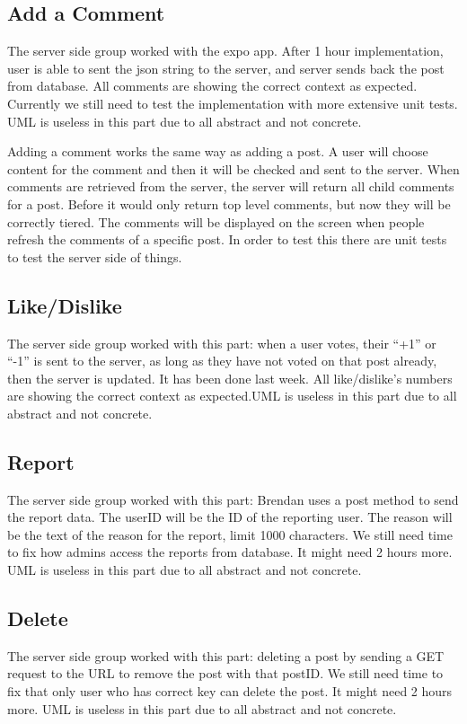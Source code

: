 \documentclass[12pt]{article}
\begin{document}
\subsection{Add a Comment}
The server side group worked with the expo app. After 1 hour implementation,
user is able to sent the json string to the server, and server sends back the
post from database. All comments are showing the correct context as expected.
Currently we still need to test the implementation with more extensive unit
tests. UML is useless in this part due to all abstract and not concrete.

Adding a comment works the same way as adding a post.  A user will choose content
for the comment and then it will be checked and sent to the server.  When comments
are retrieved from the server, the server will return all child comments for a post.
Before it would only return top level comments, but now they will be correctly
tiered.  The comments will be displayed on the screen when people refresh the
comments of a specific post.  In order to test this there are unit tests to test
the server side of things.

\subsection{Like/Dislike}
The server side group worked with this part: when a user votes, their “+1” or
“-1” is sent to the server, as long as they have not voted on that post already,
then the server is updated. It has been done last week. All like/dislike’s
numbers are showing the correct context as expected.UML is useless in this part
due to all abstract and not concrete.

\subsection{Report}
The server side group worked with this part: Brendan uses a post method to send
the report data. The userID will be the ID of the reporting user. The reason
will be the text of the reason for the report, limit 1000 characters. We still
need time to fix how admins access the reports from database. It might need 2
hours more. UML is useless in this part due to all abstract and not concrete.

\subsection{Delete}
The server side group worked with this part: deleting a post by sending a GET
request to the URL to remove the post with that postID. We still need time to
fix that only user who has correct key can delete the post. It might need 2
hours more. UML is useless in this part due to all abstract and not concrete.
\end{document}
